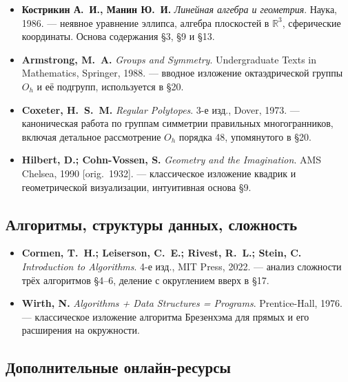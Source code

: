 \documentclass[12pt,a4paper]{scrartcl}
\begin{document}
\begin{itemize}[leftmargin=1.4em,itemsep=0.3em,topsep=0.3em]
  \item \textbf{Кострикин А.~И., Манин Ю.~И.} \emph{Линейная алгебра и геометрия}.
        Наука, 1986.
        --- неявное уравнение эллипса, алгебра плоскостей в $\mathbb{R}^3$,
        сферические координаты. Основа содержания §3, §9 и §13.

  \item \textbf{Armstrong, M.~A.} \emph{Groups and Symmetry}. Undergraduate Texts in
        Mathematics, Springer, 1988.
        --- вводное изложение октаэдрической группы $O_h$ и её подгрупп, используется в §20.

  \item \textbf{Coxeter, H.~S.~M.} \emph{Regular Polytopes}. 3-е изд., Dover, 1973.
        --- каноническая работа по группам симметрии правильных многогранников, включая детальное рассмотрение $O_h$ порядка 48, упомянутого в §20.

  \item \textbf{Hilbert, D.; Cohn-Vossen, S.} \emph{Geometry and the Imagination}.
        AMS Chelsea, 1990 [orig.~1932].
        --- классическое изложение квадрик и геометрической визуализации, интуитивная основа §9.
\end{itemize}

\subsection*{Алгоритмы, структуры данных, сложность}

\begin{itemize}[leftmargin=1.4em,itemsep=0.3em,topsep=0.3em]
  \item \textbf{Cormen, T.~H.; Leiserson, C.~E.; Rivest, R.~L.; Stein, C.}
        \emph{Introduction to Algorithms}. 4-е изд., MIT Press, 2022.
        --- анализ сложности трёх алгоритмов §4--6, деление с округлением вверх в §17.

  \item \textbf{Wirth, N.} \emph{Algorithms + Data Structures = Programs}.
        Prentice-Hall, 1976.
        --- классическое изложение алгоритма Брезенхэма для прямых и его расширения на окружности.
\end{itemize}

\subsection*{Дополнительные онлайн-ресурсы}
\end{document}
